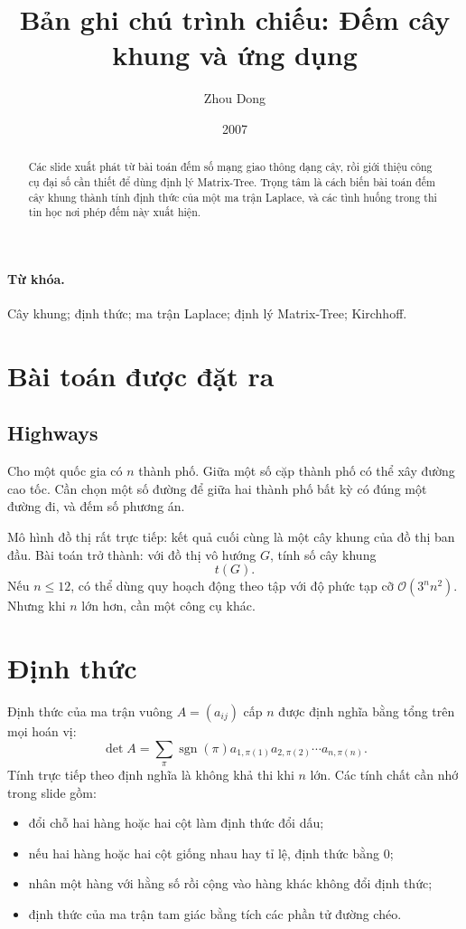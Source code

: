 \documentclass[11pt]{article}
\title{Bản ghi chú trình chiếu: Đếm cây khung và ứng dụng}
\author{Zhou Dong}
\date{2007}
\newcommand{\Oh}{\mathcal{O}}
\begin{document}
\maketitle


\begin{abstract}
Các slide xuất phát từ bài toán đếm số mạng giao thông dạng cây, rồi giới
thiệu công cụ đại số cần thiết để dùng định lý Matrix-Tree. Trọng tâm là cách
biến bài toán đếm cây khung thành tính định thức của một ma trận Laplace, và
các tình huống trong thi tin học nơi phép đếm này xuất hiện.
\end{abstract}

\paragraph{Từ khóa.}
Cây khung; định thức; ma trận Laplace; định lý Matrix-Tree; Kirchhoff.

\section{Bài toán được đặt ra}

\subsection{Highways}

Cho một quốc gia có \(n\) thành phố. Giữa một số cặp thành phố có thể xây
đường cao tốc. Cần chọn một số đường để giữa hai thành phố bất kỳ có đúng một
đường đi, và đếm số phương án.

Mô hình đồ thị rất trực tiếp: kết quả cuối cùng là một cây khung của đồ thị
ban đầu. Bài toán trở thành: với đồ thị vô hướng \(G\), tính số cây khung
\[
  t(G).
\]
Nếu \(n\le 12\), có thể dùng quy hoạch động theo tập với độ phức tạp cỡ
\(\Oh(3^n n^2)\). Nhưng khi \(n\) lớn hơn, cần một công cụ khác.

\section{Định thức}

Định thức của ma trận vuông \(A=(a_{ij})\) cấp \(n\) được định nghĩa bằng
tổng trên mọi hoán vị:
\[
  \det A=
  \sum_{\pi}
  \operatorname{sgn}(\pi)
  a_{1,\pi(1)}a_{2,\pi(2)}\cdots a_{n,\pi(n)}.
\]
Tính trực tiếp theo định nghĩa là không khả thi khi \(n\) lớn. Các tính chất
cần nhớ trong slide gồm:
\begin{itemize}
  \item đổi chỗ hai hàng hoặc hai cột làm định thức đổi dấu;
  \item nếu hai hàng hoặc hai cột giống nhau hay tỉ lệ, định thức bằng \(0\);
  \item nhân một hàng với hằng số rồi cộng vào hàng khác không đổi định thức;
  \item định thức của ma trận tam giác bằng tích các phần tử đường chéo.
\end{itemize}
\end{document}
